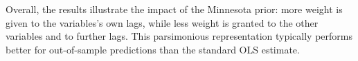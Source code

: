 Overall, the results illustrate the impact of the Minnesota prior: more weight is given to the variables's own lags, while less weight is granted to the other variables and to further lags. This parsimonious representation typically performs better for out-of-sample predictions than the standard OLS estimate. 

\newpage

















